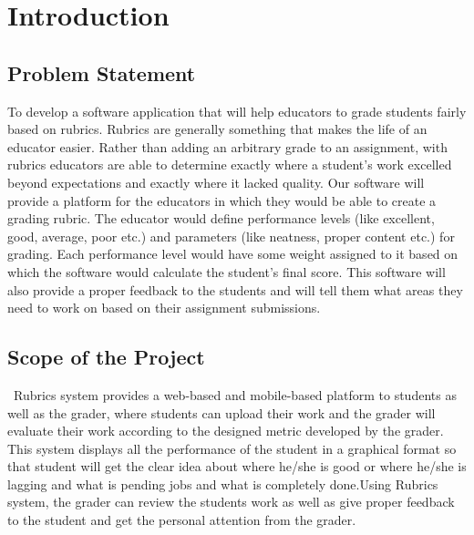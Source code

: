 \chapter{Introduction}
\section{Problem Statement}
To develop a software application that will help educators to grade students fairly based on rubrics. Rubrics are generally something that makes the life of an educator easier. Rather than adding an arbitrary grade to an assignment, with rubrics educators are able to determine exactly where a student’s work excelled beyond expectations and exactly where it lacked quality. Our software will provide a platform for the educators in which they would be able to create a grading rubric. The educator would define performance levels (like excellent, good, average, poor etc.) and parameters (like neatness, proper content etc.) for grading. Each performance level would have some weight assigned to it based on which
the software would calculate the student’s final score. This software will also provide a proper feedback to the students and will tell them what areas they need to work on based on their assignment submissions.\\
\section{Scope of the Project}\
Rubrics system provides a web-based and mobile-based platform to students as  well as the grader, where students can upload their work and the grader will evaluate their work according to the designed metric developed by the grader. This system displays all the performance of the student in a graphical format so that student will get the clear idea about where he/she is good or where he/she is lagging and what is pending jobs and what is completely done.Using Rubrics system, the grader can review the students work as well as give proper feedback to the student and get the personal attention from the grader.\\
